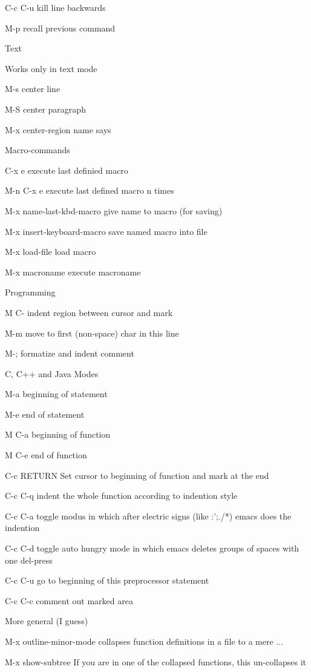 \documentclass{article}
\begin{document}
C-c C-u kill line backwards


M-p recall previous command



Text


Works only in text mode 


M-s center line


M-S center paragraph


M-x center-region name says 



Macro-commands

C-x e execute last definied macro


M-n C-x e execute last defined macro n times


M-x name-last-kbd-macro give name to macro (for saving)


M-x insert-keyboard-macro save named macro into file


M-x load-file load macro


M-x macroname execute macroname



Programming


M C-
 indent region between cursor and mark


M-m move to first (non-space) char in this line


M-; formatize and indent comment


C, C++ and Java Modes


M-a beginning of statement


M-e end of statement


M C-a beginning of function


M C-e end of function


C-c RETURN Set cursor to beginning of function and mark at the end


C-c C-q indent the whole function according to indention style


C-c C-a toggle modus in which after electric signs (like {}:';./*) emacs does the indention


C-c C-d toggle auto hungry mode in which emacs deletes groups of spaces with one del-press


C-c C-u go to beginning of this preprocessor statement


C-c C-c comment out marked area


More general (I guess)


M-x outline-minor-mode collapses function definitions in a file to a mere {...} 


M-x show-subtree If you are in one of the collapsed functions, this un-collapses it 
\end{document}
